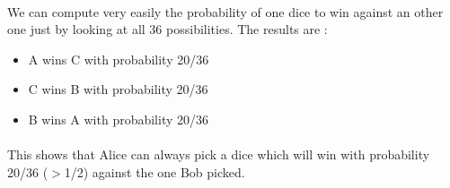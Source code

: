 \paragraph{} 
We can compute very easily the probability of one dice to win against an other one just by looking at all 36 possibilities. The results are :
\begin{itemize}
\item A wins C with probability 20/36
\item C wins B with probability 20/36
\item B wins A with probability 20/36
\end{itemize}

\paragraph{}
This shows that Alice can always pick a dice which will win with probability 20/36 ($>$1/2) against the one Bob picked.
